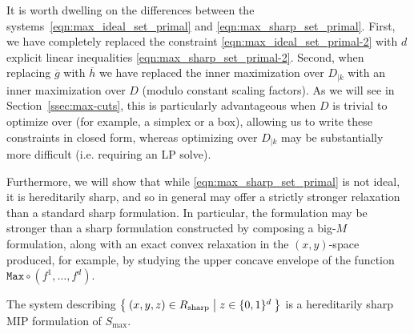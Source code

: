\documentclass[smallextended]{svjour3}
\newcommand{\bbR}{\mathbb{R}}
\newcommand{\Conv}{\operatorname{Conv}}
\newcommand{\Proj}{\operatorname{Proj}}
\newcommand{\Max}{\texttt{Max}}
\newcommand{\Rsharp}{R_{\operatorname{sharp}}}
\newcommand{\Smax}{S_{\operatorname{max}}}
\renewcommand{\bar}[1]{\overline{#1}}
\begin{document}
It is worth dwelling on the differences between the systems~\eqref{eqn:max_ideal_set_primal} and \eqref{eqn:max_sharp_set_primal}. First, we have completely replaced the constraint \eqref{eqn:max_ideal_set_primal-2} with $d$ explicit linear inequalities \eqref{eqn:max_sharp_set_primal-2}. Second, when replacing $\bar{g}$ with $\bar{h}$ we have replaced the inner maximization over $D_{|k}$ with an inner maximization over $D$ (modulo constant scaling factors). As we will see in Section~\ref{ssec:max-cuts}, this is particularly advantageous when $D$ is trivial to optimize over (for example, a simplex or a box), allowing us to write these constraints in closed form, whereas optimizing over $D_{|k}$ may be substantially more difficult (i.e. requiring an LP solve).

Furthermore, we will show that while \eqref{eqn:max_sharp_set_primal} is not ideal, it is hereditarily sharp, and so in general may offer a strictly stronger relaxation than a standard sharp formulation. In particular, the formulation may be stronger than a sharp formulation constructed by composing a big-$M$ formulation, along with an exact convex relaxation in the $(x,y)$-space produced, for example, by studying the upper concave envelope of the function $\Max \circ (f^1,\ldots,f^d)$.

\begin{proposition} \label{prop:max_sharp_set_primal}
    The system describing $\Set{(x,y,z) \in \Rsharp | z \in \{0,1\}^d}$ is a hereditarily sharp MIP formulation of $\Smax$.
\end{proposition}

\end{document}
